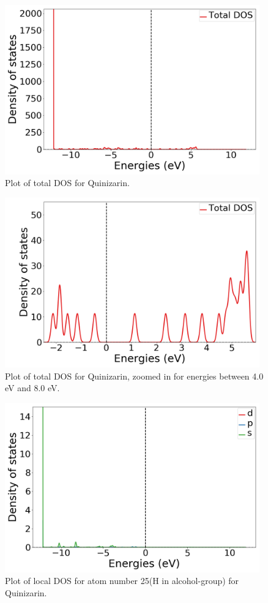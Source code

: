 \documentclass{article}
\begin{document}
  \begin{figure}[H]
      \centering
      \includegraphics[width = 11cm]{../fig/basic_TDOS_1.png}
      \caption{Plot of total DOS for Quinizarin. }
      \label{fig:basic_TDOS_1}
  \end{figure}

  \begin{figure}[H]
      \centering
      \includegraphics[width = 11cm]{../fig/basic_TDOS_2.png}
      \caption{Plot of total DOS for Quinizarin, zoomed in for energies between 4.0 eV and 8.0 eV. }
      \label{fig:basic_TDOS_2}
  \end{figure}

  \begin{figure}[H]
      \centering
      \includegraphics[width = 11cm]{../fig/basic_LDOS25_1.png}
      \caption{Plot of local DOS for atom number 25(H in alcohol-group) for Quinizarin.}
      \label{fig:basic_LDOS25_1}
  \end{figure}
\end{document}
